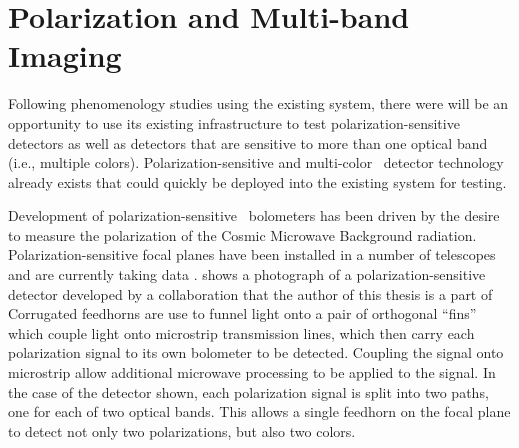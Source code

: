 \section{Polarization and Multi-band Imaging}

Following phenomenology studies using the existing system, there were will be an opportunity to use its existing infrastructure to test polarization-sensitive detectors as well as detectors that are sensitive to more than one optical band (i.e., multiple colors).
Polarization-sensitive and multi-color \TES\ detector technology already exists that could quickly be deployed into the existing system for testing.

Development of polarization-sensitive \TES\ bolometers has been driven by the desire to measure the polarization of the Cosmic Microwave Background radiation.
Polarization-sensitive focal planes have been installed in a number of telescopes and are currently taking data \cite{obrient_antenna-coupled_2012,austermann_sptpol:_2012,keating_ultra_2011,niemack_actpol:_2010,kusaka_modulation_2013}.
 shows a photograph of a polarization-sensitive detector developed by a collaboration that the author of this thesis is a part of \cite{datta_horn_2014}
Corrugated feedhorns are use to funnel light onto a pair of orthogonal ``fins'' which couple light onto microstrip transmission lines, which then carry each polarization signal to its own bolometer to be detected.
Coupling the signal onto microstrip allow additional microwave processing to be applied to the signal.
In the case of the detector shown, each polarization signal is split into two paths, one for each of two optical bands.
This allows a single feedhorn on the focal plane to detect not only two polarizations, but also two colors.

